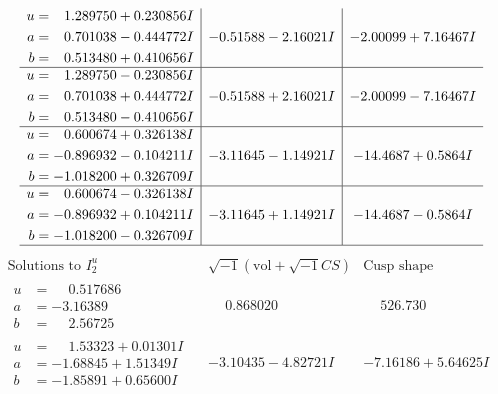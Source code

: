 \documentclass[1p]{elsarticle_modified}
\theoremstyle{definition}
\newcommand{\I}{\sqrt{-1}}
\begin{document}
$$\begin{array}{c|c|c}
\begin{aligned}
u &= \phantom{-}1.289750 + 0.230856 I \\
a &= \phantom{-}0.701038 - 0.444772 I \\
b &= \phantom{-}0.513480 + 0.410656 I\end{aligned}
 & -0.51588 - 2.16021 I & -2.00099 + 7.16467 I \\ \hline\begin{aligned}
u &= \phantom{-}1.289750 - 0.230856 I \\
a &= \phantom{-}0.701038 + 0.444772 I \\
b &= \phantom{-}0.513480 - 0.410656 I\end{aligned}
 & -0.51588 + 2.16021 I & -2.00099 - 7.16467 I \\ \hline\begin{aligned}
u &= \phantom{-}0.600674 + 0.326138 I \\
a &= -0.896932 - 0.104211 I \\
b &= -1.018200 + 0.326709 I\end{aligned}
 & -3.11645 - 1.14921 I & -14.4687 + 0.5864 I \\ \hline\begin{aligned}
u &= \phantom{-}0.600674 - 0.326138 I \\
a &= -0.896932 + 0.104211 I \\
b &= -1.018200 - 0.326709 I\end{aligned}
 & -3.11645 + 1.14921 I & -14.4687 - 0.5864 I\\
 \hline 
 \end{array}$$\newpage$$\begin{array}{c|c|c}  
\text{Solutions to }I^u_{2}& \I (\text{vol} + \sqrt{-1}CS) & \text{Cusp shape}\\
 \hline 
\begin{aligned}
u &= \phantom{-}0.517686\phantom{ +0.000000I} \\
a &= -3.16389\phantom{ +0.000000I} \\
b &= \phantom{-}2.56725\phantom{ +0.000000I}\end{aligned}
 & \phantom{-}0.868020\phantom{ +0.000000I} & \phantom{-}526.730\phantom{ +0.000000I} \\ \hline\begin{aligned}
u &= \phantom{-}1.53323 + 0.01301 I \\
a &= -1.68845 + 1.51349 I \\
b &= -1.85891 + 0.65600 I\end{aligned}
 & -3.10435 - 4.82721 I & -7.16186 + 5.64625 I \\ \hline\begin{aligned}

\end{aligned}
\end{array}$$
\end{document}
